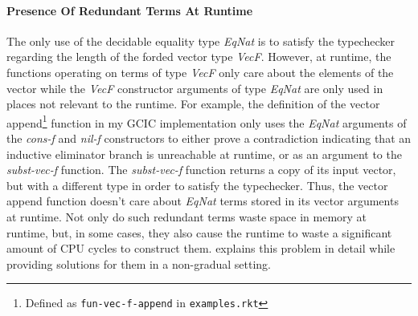 \documentclass{article}
\theoremstyle{definition}
\newcommand{\Gcode}[1]{{\color{OliveGreen}\textit{#1}}}
\begin{document}
\paragraph{Presence Of Redundant Terms At Runtime}
The only use of the decidable equality type \Gcode{EqNat} is to satisfy the
typechecker regarding the length of the forded vector type \Gcode{VecF}.
However, at runtime, the functions operating on terms of type \Gcode{VecF} only
care about the elements of the vector while the \Gcode{VecF} constructor
arguments of type \Gcode{EqNat} are only used in places not relevant to the
runtime. For example, the definition of the vector append\footnote{Defined as
\texttt{fun-vec-f-append} in \texttt{examples.rkt}} function in my GCIC
implementation only uses the \Gcode{EqNat} arguments of the \Gcode{cons-f} and
\Gcode{nil-f} constructors to either prove a contradiction indicating that an
inductive eliminator branch is unreachable at runtime, or as an argument to the
\Gcode{subst-vec-f} function. The \Gcode{subst-vec-f} function returns a copy of
its input vector, but with a different type in order to satisfy the typechecker.
Thus, the vector append function doesn't care about \Gcode{EqNat} terms stored
in its vector arguments at runtime. Not only do such redundant terms waste space
in memory at runtime, but, in some cases, they also cause the runtime to waste a
significant amount of CPU cycles to construct them.
\citet{tejiscak_erasure_2020} explains this problem in detail while providing
solutions for them in a non-gradual setting.
\end{document}

